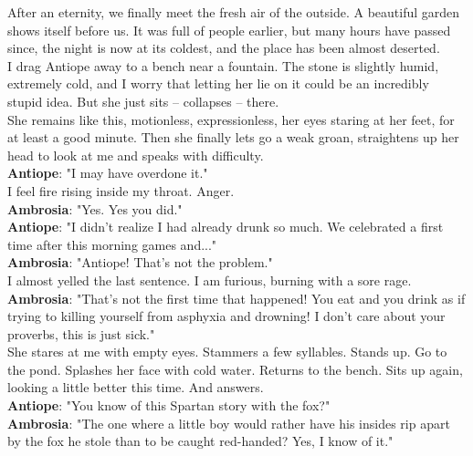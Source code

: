 \documentclass{report}
\newcommand{\speaker}[1]{
	\textbf{#1}: 
}
\begin{document}
After an eternity, we finally meet the fresh air of the outside. A beautiful garden shows itself before us. It was full of people earlier, but many hours have passed since, the night is now at its coldest, and the place has been almost deserted.\\

I drag Antiope away to a bench near a fountain. The stone is slightly humid, extremely cold, and I worry that letting her lie on it could be an incredibly stupid idea. But she just sits – collapses – there.\\

She remains like this, motionless, expressionless, her eyes staring at her feet, for at least a good minute. Then she finally lets go a weak groan, straightens up her head to look at me and speaks with difficulty.\\

\speaker{Antiope} "I may have overdone it."\\

I feel fire rising inside my throat. Anger.\\

\speaker{Ambrosia} "Yes. Yes you did."\\

\speaker{Antiope} "I didn't realize I had already drunk so much. We celebrated a first time after this morning games and..."\\

\speaker{Ambrosia} "Antiope! That's not the problem."\\

I almost yelled the last sentence. I am furious, burning with a sore rage.\\

\speaker{Ambrosia} "That's not the first time that happened! You eat and you drink as if trying to killing yourself from asphyxia and drowning! I don't care about your proverbs, this is just sick."\\

She stares at me with empty eyes. Stammers a few syllables. Stands up. Go to the pond. Splashes her face with cold water. Returns to the bench. Sits up again, looking a little better this time. And answers.\\

\speaker{Antiope} "You know of this Spartan story with the fox?"\\

\speaker{Ambrosia} "The one where a little boy would rather have his insides rip apart by the fox he stole than to be caught red-handed? Yes, I know of it."\\
\end{document}
